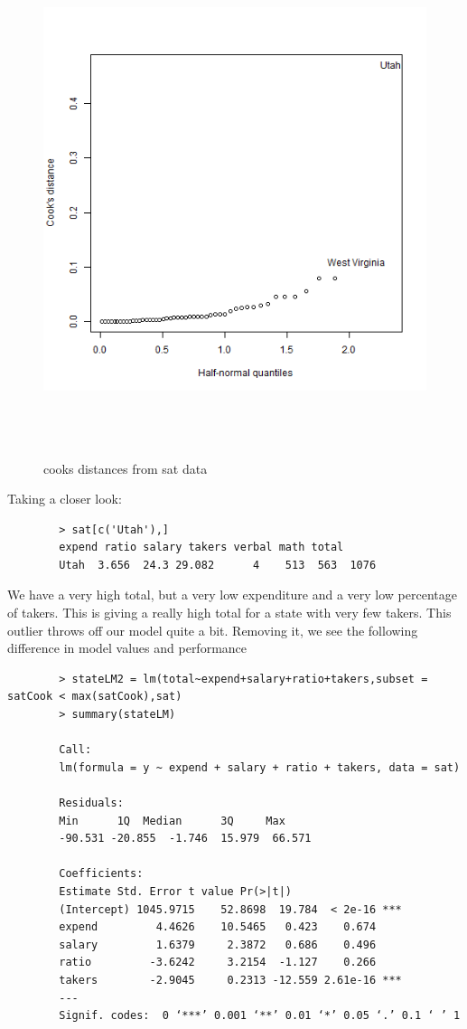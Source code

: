 \documentclass[11pt]{article}
\begin{document}
\begin{enumerate}
\begin{figure}[H]
		\includegraphics[width=15cm,height=15cm]{satCD.png}
		\caption[satCD]{cooks distances from sat data}
		\label{cooks distanced sat}
	\end{figure}
	Taking a closer look:
	\begin{verbatim}
		> sat[c('Utah'),]
		expend ratio salary takers verbal math total
		Utah  3.656  24.3 29.082      4    513  563  1076
	\end{verbatim}
	We have a very high total, but a very low expenditure and a very low percentage of takers. This is giving a really high total for a state with very few takers. This outlier throws off our model quite a bit. Removing it, we see the following difference in model values and performance
	\begin{verbatim}
		> stateLM2 = lm(total~expend+salary+ratio+takers,subset = satCook < max(satCook),sat)
		> summary(stateLM)
		
		Call:
		lm(formula = y ~ expend + salary + ratio + takers, data = sat)
		
		Residuals:
		Min      1Q  Median      3Q     Max 
		-90.531 -20.855  -1.746  15.979  66.571 
		
		Coefficients:
		Estimate Std. Error t value Pr(>|t|)    
		(Intercept) 1045.9715    52.8698  19.784  < 2e-16 ***
		expend         4.4626    10.5465   0.423    0.674    
		salary         1.6379     2.3872   0.686    0.496    
		ratio         -3.6242     3.2154  -1.127    0.266    
		takers        -2.9045     0.2313 -12.559 2.61e-16 ***
		---
		Signif. codes:  0 ‘***’ 0.001 ‘**’ 0.01 ‘*’ 0.05 ‘.’ 0.1 ‘ ’ 1
		

\end{verbatim}
\end{enumerate}
\end{document}
